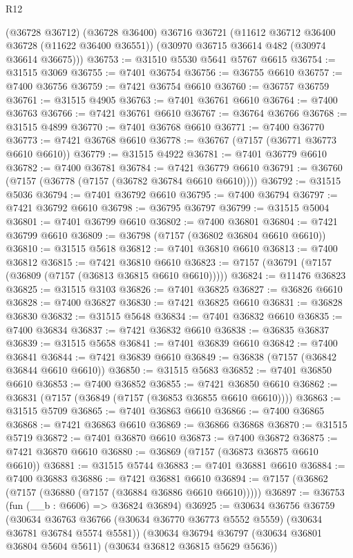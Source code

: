 \begin{lexlean}{R12}
\begin{coremodule}
      (@36728 @36712)
      (@36728 @36400)
      @36716
      @36721
      (@11612 @36712 @36400 @36728 (@11622 @36400 @36551))
      (@30970 @36715 @36614 @482 (@30974 @36614 @36675)))
@36753 := @31510 @5530 @5641 @5767 @6615
@36754 := @31515 @3069
@36755 := @7401 @36754
@36756 := @36755 @6610
@36757 := @7400 @36756
@36759 := @7421 @36754 @6610
@36760 := @36757 @36759
@36761 := @31515 @4905
@36763 := @7401 @36761 @6610
@36764 := @7400 @36763
@36766 := @7421 @36761 @6610
@36767 := @36764 @36766
@36768 := @31515 @4899
@36770 := @7401 @36768 @6610
@36771 := @7400 @36770
@36773 := @7421 @36768 @6610
@36778 := @36767 (@7157 (@36771 @36773 @6610 @6610))
@36779 := @31515 @4922
@36781 := @7401 @36779 @6610
@36782 := @7400 @36781
@36784 := @7421 @36779 @6610
@36791 := @36760 (@7157 (@36778 (@7157 (@36782 @36784 @6610 @6610))))
@36792 := @31515 @5036
@36794 := @7401 @36792 @6610
@36795 := @7400 @36794
@36797 := @7421 @36792 @6610
@36798 := @36795 @36797
@36799 := @31515 @5004
@36801 := @7401 @36799 @6610
@36802 := @7400 @36801
@36804 := @7421 @36799 @6610
@36809 := @36798 (@7157 (@36802 @36804 @6610 @6610))
@36810 := @31515 @5618
@36812 := @7401 @36810 @6610
@36813 := @7400 @36812
@36815 := @7421 @36810 @6610
@36823 := @7157 (@36791 (@7157 (@36809 (@7157 (@36813 @36815 @6610 @6610)))))
@36824 := @11476 @36823
@36825 := @31515 @3103
@36826 := @7401 @36825
@36827 := @36826 @6610
@36828 := @7400 @36827
@36830 := @7421 @36825 @6610
@36831 := @36828 @36830
@36832 := @31515 @5648
@36834 := @7401 @36832 @6610
@36835 := @7400 @36834
@36837 := @7421 @36832 @6610
@36838 := @36835 @36837
@36839 := @31515 @5658
@36841 := @7401 @36839 @6610
@36842 := @7400 @36841
@36844 := @7421 @36839 @6610
@36849 := @36838 (@7157 (@36842 @36844 @6610 @6610))
@36850 := @31515 @5683
@36852 := @7401 @36850 @6610
@36853 := @7400 @36852
@36855 := @7421 @36850 @6610
@36862 := @36831 (@7157 (@36849 (@7157 (@36853 @36855 @6610 @6610))))
@36863 := @31515 @5709
@36865 := @7401 @36863 @6610
@36866 := @7400 @36865
@36868 := @7421 @36863 @6610
@36869 := @36866 @36868
@36870 := @31515 @5719
@36872 := @7401 @36870 @6610
@36873 := @7400 @36872
@36875 := @7421 @36870 @6610
@36880 := @36869 (@7157 (@36873 @36875 @6610 @6610))
@36881 := @31515 @5744
@36883 := @7401 @36881 @6610
@36884 := @7400 @36883
@36886 := @7421 @36881 @6610
@36894 := @7157 (@36862 (@7157 (@36880 (@7157 (@36884 @36886 @6610 @6610)))))
@36897 := @36753 (fun (__b : @6606) => @36824 @36894)
@36925 := @30634
    @36756
    @36759
    (@30634 @36763 @36766 (@30634 @36770 @36773 @5552 @5559) (@30634 @36781 @36784 @5574 @5581))
    (@30634 @36794 @36797 (@30634 @36801 @36804 @5604 @5611) (@30634 @36812 @36815 @5629 @5636))

\end{coremodule}
\end{lexlean}
